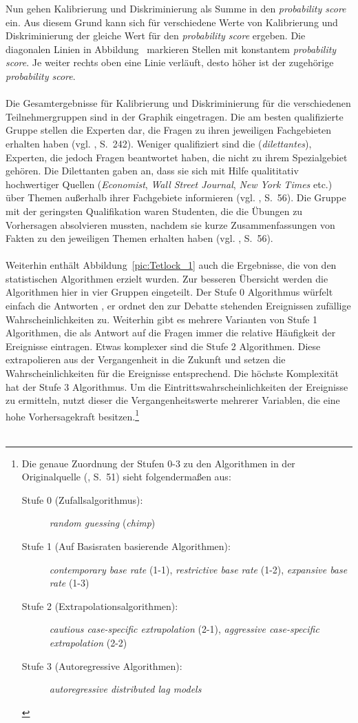Nun gehen Kalibrierung und Diskriminierung als Summe in den
\emph{probability score} ein. Aus diesem Grund kann sich für verschiedene
Werte von Kalibrierung und Diskriminierung der gleiche Wert für den
\emph{probability score} ergeben. Die diagonalen Linien in Abbildung~\xcom
markieren Stellen mit konstantem \emph{probability score}. Je weiter rechts oben
eine Linie verläuft, desto höher ist der zugehörige \emph{probability score}.
\\ \\
Die Gesamtergebnisse für Kalibrierung und Diskriminierung für die verschiedenen
Teilnehmergruppen sind in der Graphik eingetragen. Die am besten qualifizierte
Gruppe stellen die Experten dar, die Fragen zu ihren jeweiligen Fachgebieten
erhalten haben (vgl. \cite{Tetlock}, S.~242). Weniger qualifiziert sind die 
\grqq (\emph{dilettantes}), Experten, die jedoch Fragen
beantwortet haben, die nicht zu ihrem Spezialgebiet gehören. Die Dilettanten
gaben an, dass sie sich mit Hilfe qualititativ hochwertiger Quellen
(\emph{Economist}, \emph{Wall Street Journal}, \emph{New York Times} etc.) über
Themen außerhalb ihrer Fachgebiete informieren (vgl. \cite{Tetlock}, S.~56).
Die Gruppe mit der geringsten Qualifikation waren Studenten, die die Übungen
zu Vorhersagen absolvieren mussten, nachdem sie kurze Zusammenfassungen von
Fakten zu den jeweiligen Themen erhalten haben (vgl. \cite{Tetlock}, S.~56).
\\ \\
Weiterhin enthält Abbildung~\ref{pic:Tetlock_1} auch die Ergebnisse, die von den
statistischen Algorithmen erzielt wurden. Zur besseren Übersicht werden die
Algorithmen hier in vier Gruppen eingeteilt. Der Stufe 0 Algorithmus würfelt
einfach die Antworten , er ordnet den zur Debatte stehenden Ereignissen
zufällige Wahrscheinlichkeiten zu. Weiterhin gibt es mehrere Varianten von
Stufe 1 Algorithmen, die als Antwort auf die Fragen immer die relative
Häufigkeit der Ereignisse eintragen. Etwas komplexer sind die Stufe 2
Algorithmen. Diese extrapolieren aus der Vergangenheit in die Zukunft und setzen
die Wahrscheinlichkeiten für die Ereignisse entsprechend. Die höchste
Komplexität hat der Stufe 3 Algorithmus. Um die Eintrittswahrscheinlichkeiten
der Ereignisse zu ermitteln, nutzt dieser die Vergangenheitswerte mehrerer
Variablen, die eine hohe Vorhersagekraft besitzen.\footnote{Die genaue Zuordnung
der Stufen 0-3 zu den Algorithmen in der Originalquelle (\cite{Tetlock}, S.~51)
sieht folgendermaßen aus:
\begin{description}
\item[Stufe 0 (Zufallsalgorithmus):] \emph{random guessing} (\emph{chimp})
\item[Stufe 1 (Auf Basisraten basierende Algorithmen):] 
  \emph{contemporary base rate} (1-1), \emph{restrictive base rate} (1-2),
  \emph{expansive base rate} (1-3)
\item[Stufe 2 (Extrapolationsalgorithmen):] \emph{cautious case-specific
  extrapolation} (2-1), \emph{aggressive case-specific extrapolation} (2-2)
\item[Stufe 3 (Autoregressive Algorithmen):] \emph{autoregressive distributed
  lag models}
\end{description}
} \\ \\
